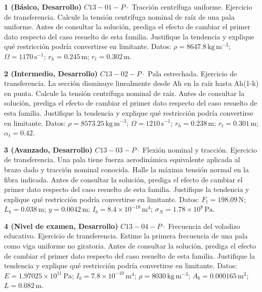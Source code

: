 \documentclass[10pt,openany]{book}
\begin{document}
\begin{tcolorbox}[title={Ejercicios propuestos}, studiumworked, breakable]

\noindent\textbf{1 (Básico, Desarrollo)}
\(C13-01-P \cdot\) Tracción centrífuga uniforme. Ejercicio de transferencia. Calcule la tensión centrífuga nominal de raíz de una pala uniforme. Antes de consultar la solución, prediga el efecto de cambiar el primer dato respecto del caso resuelto de esta familia. Justifique la tendencia y explique qué restricción podría convertirse en limitante. Datos: \(\rho=8647.8\, \mathrm{kg}\,\mathrm{m}^{-3}\); \(\Omega=1170\, \mathrm{s}^{-1}\); \(r_h=0.245\, \mathrm{m}\); \(r_t=0.302\, \mathrm{m}\).

\noindent\textbf{2 (Intermedio, Desarrollo)}
\(C13-02-P \cdot\) Pala estrechada. Ejercicio de transferencia. La sección disminuye linealmente desde Ah en la raíz hasta Ah(1-k) en punta. Calcule la tensión centrífuga nominal de raíz. Antes de consultar la solución, prediga el efecto de cambiar el primer dato respecto del caso resuelto de esta familia. Justifique la tendencia y explique qué restricción podría convertirse en limitante. Datos: \(\rho=8573.25\, \mathrm{kg}\,\mathrm{m}^{-3}\); \(\Omega=1210\, \mathrm{s}^{-1}\); \(r_h=0.238\, \mathrm{m}\); \(r_t=0.301\, \mathrm{m}\); \(\alpha_t=0.42\).

\noindent\textbf{3 (Avanzado, Desarrollo)}
\(C13-03-P \cdot\) Flexión nominal y tracción. Ejercicio de transferencia. Una pala tiene fuerza aerodinámica equivalente aplicada al brazo dado y tracción nominal conocida. Halle la máxima tensión normal en la fibra indicada. Antes de consultar la solución, prediga el efecto de cambiar el primer dato respecto del caso resuelto de esta familia. Justifique la tendencia y explique qué restricción podría convertirse en limitante. Datos: \(F_t=198.09\, \mathrm{N}\); \(L_b=0.038\, \mathrm{m}\); \(y=0.0042\, \mathrm{m}\); \(I_b=8.4\times 10^{-10}\, \mathrm{m}^{4}\); \(\sigma_N=1.78\times 10^{8}\, \mathrm{Pa}\).

\noindent\textbf{4 (Nivel de examen, Desarrollo)}
\(C13-04-P \cdot\) Frecuencia del voladizo educativo. Ejercicio de transferencia. Estime la primera frecuencia de una pala como viga uniforme no giratoria. Antes de consultar la solución, prediga el efecto de cambiar el primer dato respecto del caso resuelto de esta familia. Justifique la tendencia y explique qué restricción podría convertirse en limitante. Datos: \(E=1.97025\times 10^{11}\, \mathrm{Pa}\); \(I_b=7.8\times 10^{-10}\, \mathrm{m}^{4}\); \(\rho=8030\, \mathrm{kg}\,\mathrm{m}^{-3}\); \(A_b=0.000165\, \mathrm{m}^{2}\); \(L=0.082\, \mathrm{m}\).
\end{tcolorbox}
\end{document}
